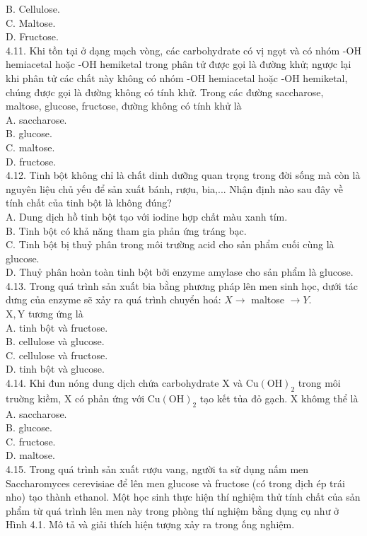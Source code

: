 \documentclass[10pt]{article}
\begin{document}
B. Cellulose.\\
C. Maltose.\\
D. Fructose.\\
4.11. Khi tồn tại ở dạng mạch vòng, các carbohydrate có vị ngọt và có nhóm -OH hemiacetal hoặc -OH hemiketal trong phân tử được gọi là đường khử; ngược lại khi phân tử các chất này không có nhóm -OH hemiacetal hoặc -OH hemiketal, chúng được gọi là đường không có tính khử. Trong các đường saccharose, maltose, glucose, fructose, đường không có tính khử là\\
A. saccharose.\\
B. glucose.\\
C. maltose.\\
D. fructose.\\
4.12. Tinh bột không chỉ là chất dinh dưỡng quan trọng trong đời sống mà còn là nguyên liệu chủ yếu để sản xuất bánh, rượu, bia,... Nhận định nào sau đây về tính chất của tinh bột là không đúng?\\
A. Dung dịch hồ tinh bột tạo với iodine hợp chất màu xanh tím.\\
B. Tinh bột có khả năng tham gia phản ứng tráng bạc.\\
C. Tinh bột bị thuỷ phân trong môi trường acid cho sản phẩm cuối cùng là glucose.\\
D. Thuỷ phân hoàn toàn tinh bột bởi enzyme amylase cho sản phẩm là glucose.\\
4.13. Trong quá trình sản xuất bia bằng phương pháp lên men sinh học, dưới tác dưng của enzyme sẽ xảy ra quá trình chuyển hoá: $X \rightarrow$ maltose $\rightarrow Y$.\\
$\mathrm{X}, \mathrm{Y}$ tương ứng là\\
A. tinh bột và fructose.\\
B. cellulose và glucose.\\
C. cellulose và fructose.\\
D. tinh bột và glucose.\\
4.14. Khi đun nóng dung dịch chứa carbohydrate X và $\mathrm{Cu}(\mathrm{OH})_{2}$ trong môi truờng kiềm, X có phản ứng với $\mathrm{Cu}(\mathrm{OH})_{2}$ tạo kết tủa đỏ gạch. X khômg thể là\\
A. saccharose.\\
B. glucose.\\
C. fructose.\\
D. maltose.\\
4.15. Trong quá trình sản xuất rượu vang, người ta sử dụng nấm men Saccharomyces cerevisiae để lên men glucose và fructose (có trong dịch ép trái nho) tạo thành ethanol. Một học sinh thực hiện thí nghiệm thử tính chất của sản phẩm từ quá trình lên men này trong phòng thí nghiệm bằng dụng cụ như ở Hình 4.1. Mô tả và giải thích hiện tượng xảy ra trong ống nghiệm.
\end{document}
